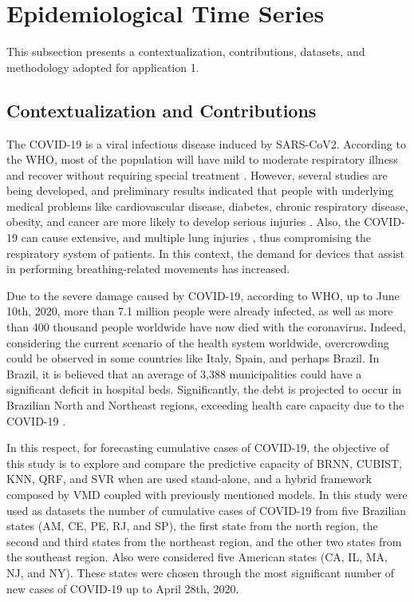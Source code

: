 \section{Epidemiological Time Series} \label{sec:epidemio}

This subsection presents a contextualization, contributions, datasets, and methodology adopted for application 1.


\subsection{Contextualization and Contributions}

The \ac{COVID-19} is a viral infectious disease induced by \ac{SARS-CoV2}. According to the \ac{WHO}, most of the population will have mild to moderate respiratory illness and recover without requiring special treatment \cite{worldhealthorganizationwho2020Coronavirus}. However, several studies are being developed, and preliminary results indicated that people with underlying medical problems like cardiovascular disease, diabetes, chronic respiratory disease, obesity, and cancer are more likely to develop serious injuries \cite{bansal2020Cardiovascular,lai2020Severe,hussain2020COVID19,moujaess2020Cancer,abbas2020Mutual,su2020Renal}. Also, the \ac{COVID-19} can cause extensive, and multiple lung injuries \cite{guan2020Clinical}, thus compromising the respiratory system of patients. In this context, the demand for devices that assist in performing breathing-related movements has increased. 

Due to the severe damage caused by \ac{COVID-19}, according to \ac{WHO}, up to June 10th, 2020, more than 7.1 million people were already infected, as well as more than 400 thousand people worldwide have now died with the coronavirus. Indeed, considering the current scenario of the health system worldwide, overcrowding could be observed in some countries like Italy, Spain, and perhaps Brazil. In Brazil, it is believed that an average of 3,388 municipalities could have a significant deficit in hospital beds. Significantly, the debt is projected to occur in Brazilian North and Northeast regions, exceeding health care capacity due to the \ac{COVID-19} \cite{requia2020Risk}. 

In this respect, for forecasting cumulative cases of \ac{COVID-19}, the objective of this study is to explore and compare the predictive capacity of \ac{BRNN}, \ac{CUBIST}, \ac{KNN}, \ac{QRF}, and \ac{SVR} when are used stand-alone, and a hybrid framework composed by \ac{VMD} coupled with previously mentioned models. In this study were used as datasets the number of cumulative cases of \ac{COVID-19} from five Brazilian states (\ac{AM}, \ac{CE}, \ac{PE}, \ac{RJ}, and \ac{SP}), the first state from the north region, the second and third states from the northeast region, and the other two states from the southeast region. Also were considered five  American states (\ac{CA}, \ac{IL}, \ac{MA}, \ac{NJ}, and \ac{NY}). These states were chosen through the most significant number of new cases of \ac{COVID-19} up to April 28th, 2020.  

